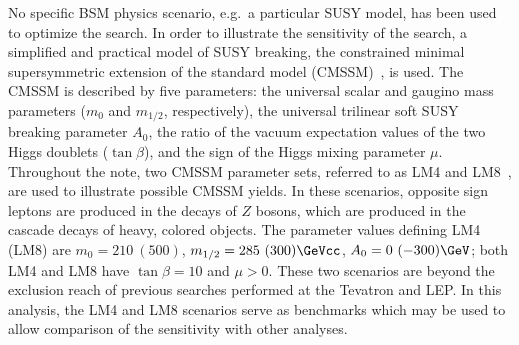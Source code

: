 No specific BSM  physics scenario, e.g.\ a particular  SUSY model, has
been  used  to  optimize  the  search.  In  order  to  illustrate  the
sensitivity of  the search, a  simplified and practical model  of SUSY
breaking,  the  constrained minimal  supersymmetric  extension of  the
standard  model  (CMSSM)~\cite{CMSSM,CMSSM2}, is  used.  The CMSSM  is
described by  five parameters: the  universal scalar and  gaugino mass
parameters   ($m_0$  and   $m_{1/2}$,  respectively),   the  universal
trilinear soft SUSY breaking parameter  $A_0$, the ratio of the vacuum
expectation values  of the two  Higgs doublets ($\tan\beta$),  and the
sign of  the Higgs mixing  parameter $\mu$.  Throughout the  note, two
CMSSM parameter sets, referred to  as LM4 and LM8~\cite{TDR}, are used
to  illustrate possible  CMSSM yields.   In these  scenarios, opposite
sign  leptons are  produced  in  the decays  of $Z$  bosons, which  are
produced  in  the  cascade  decays  of heavy,  colored  objects.   The
parameter  values defining  LM4  (LM8) are  $m_0  = 210~(500)$\GeVcc,
$m_{1/2} = 285~(300) \GeVcc$,  $A_0 = 0~(-300)\GeV$; both LM4 and
LM8 have $\tan\beta = 10$ and $\mu  > 0$. These two scenarios are beyond the
exclusion  reach of previous  searches performed  at the  Tevatron and
LEP.  In this analysis, the  LM4 and LM8 scenarios serve as benchmarks
which may  be used to allow  comparison of the  sensitivity with other
analyses.
